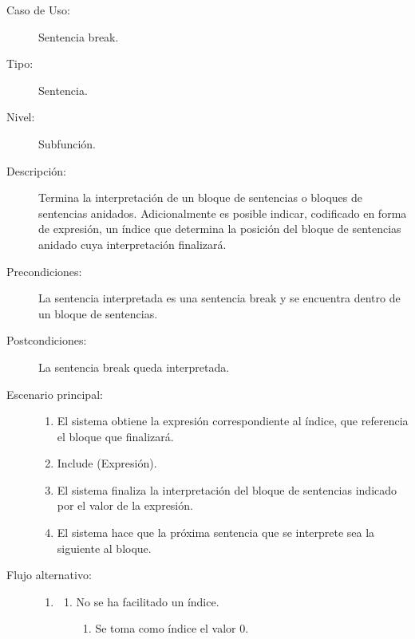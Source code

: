 \begin{framed}
\FloatBarrier
\begin{description}
   \item[Caso de Uso:]  Sentencia break.
   \item [Tipo:] Sentencia.
   \item[Nivel:]  Subfunción.
   \item[Descripción:] 
   Termina la interpretación de un bloque de sentencias o bloques de sentencias anidados. Adicionalmente
   es posible indicar, codificado en forma de expresión, un índice que determina la posición del bloque de sentencias anidado cuya 
   interpretación finalizará.
   \item[Precondiciones:] 
   La sentencia interpretada es una sentencia break y se encuentra dentro de un bloque de sentencias.
   \item[Postcondiciones:] 
   La sentencia break queda interpretada.
   \item[Escenario principal:] \hfill
   \begin{enumerate}
   \item El sistema obtiene la expresión correspondiente al índice, que referencia el bloque que finalizará.
   \item Include (Expresión).
   \item El sistema finaliza la interpretación del bloque de sentencias indicado por el valor de la expresión. 
   \item El sistema hace que la próxima sentencia que se interprete sea la siguiente al bloque.
   \end{enumerate}
   \item[Flujo alternativo:] \hfill 
   \begin{enumerate} \itemsep1pt \parskip0pt 
   \setcounter{enumi}{0}
   \renewcommand{\labelenumi}{}
   \renewcommand{\labelenumiii}{\arabic{enumiii}.}
   \renewcommand{\labelenumii}{\arabic{enumi}\alph{enumii}.}
      \item 
      \begin {enumerate}
         \setcounter{enumii}{0}
         \item No se ha facilitado un índice.
         \begin{enumerate}
         \item Se toma como índice el valor 0. 
         \end{enumerate}
      \end{enumerate}
   \end{enumerate}
   \begin{enumerate} \itemsep1pt \parskip0pt 

\end{enumerate}
\end{description}
\end{framed}
